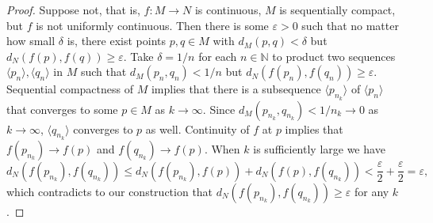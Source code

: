 \begin{proof}
  Suppose not, that is, $f: M \to N$ is continuous, $M$ is sequentially compact, but $f$ is not uniformly continuous.
  Then there is some $\varepsilon > 0$ such that no matter how small $\delta$ is, there exist points $p, q \in M$ with $d_M(p,q) < \delta$ but $d_N( f(p), f(q) ) \geqslant \varepsilon$.
  Take $\delta = 1/n$ for each $n \in \mathbb{N}$ to product two sequences $\langle p_n \rangle, \langle q_n \rangle$ in $M$ such that $d_M(p_n,q_n) < 1/n$ but $d_N(f(p_n),f(q_n)) \geqslant \varepsilon$.
  Sequential compactness of $M$ implies that there is a subsequence $\langle p_{n_k}\rangle$ of $\langle p_n \rangle$ that converges to some $p \in M$ as $k \to \infty$.
  Since $d_M(p_{n_k}, q_{n_k}) < 1/n_k \to 0$ as $k \to \infty$, $\langle q_{n_k} \rangle$ converges to $p$ as well.
  Continuity of $f$ at $p$ implies that $f(p_{n_k}) \to f(p)$ and $f(q_{n_k}) \to f(p)$.
  When $k$ is sufficiently large we have
  \[
    d_N(f(p_{n_k}), f(q_{n_k})) \leqslant d_N( f(p_{n_k}), f(p) ) + d_N( f(p), f(q_{n_k}) ) < \frac{\varepsilon}{2} + \frac{\varepsilon}{2} = \varepsilon,
  \]
  which contradicts to our construction that $d_N(f(p_{n_k}),f(q_{n_k})) \geqslant \varepsilon$ for any $k$.
\end{proof}
